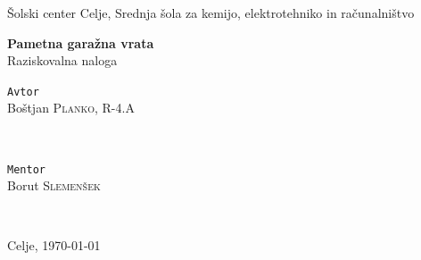 \documentclass[11pt]{article}
\begin{document}
\renewcommand{\theFancyVerbLine}{
  \sffamily\textcolor[rgb]{0.5,0.5,0.5}{\scriptsize\arabic{FancyVerbLine}}}
\begin{titlepage}
\thispagestyle{empty}
   \center
   \fancyhead{}
   \large{Šolski center Celje, Srednja šola za kemijo, elektrotehniko in računalništvo}\\[1.5cm]
   \vspace*{\fill}
   \begin{center}
   \Huge{\bfseries Pametna garažna vrata}\\
   \vspace{1mm}
   \large{Raziskovalna naloga}
   \end{center}
   \vspace*{\fill}
	
	\begin{minipage}{0.4\textwidth}
		\begin{flushleft}
		\vspace{4.5mm}
			\large
			\texttt{Avtor}\\
			Boštjan \textsc{Planko}, R-4.A \\ %
		\end{flushleft}
	\end{minipage}
	~
	\begin{minipage}{0.5\textwidth}
		\begin{flushright}
			\large
			\texttt{Mentor}\\
			Borut \textsc{Slemenšek} %
		\end{flushright}
	\end{minipage}
	~
	\begin{minipage}{0.5\textwidth}
		\begin{center}
		    \vspace{3mm}
			\large{Celje, \today}
		\end{center}
	\end{minipage}
	\fancyfoot{}
\end{titlepage}
\end{document}
